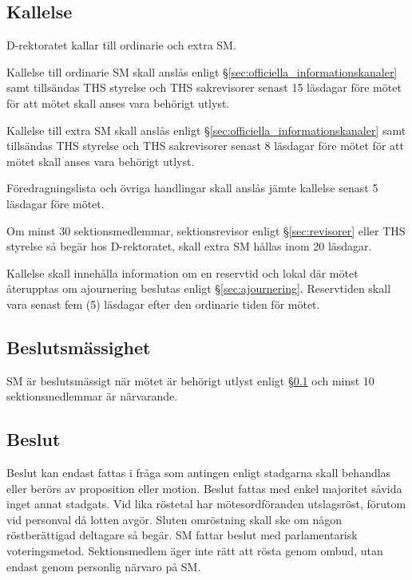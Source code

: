 \documentclass{dgovdoc}
\begin{document}
\subsection{Kallelse}
\label{sec:kallelse}

D-rektoratet kallar till ordinarie och extra SM.

Kallelse till ordinarie SM skall anslås enligt
\S\ref{sec:officiella_informationskanaler} samt tillsändas THS styrelse och THS
sakrevisorer senast 15 läsdagar före mötet för att mötet skall anses vara
behörigt utlyst.

Kallelse till extra SM skall anslås enligt
\S\ref{sec:officiella_informationskanaler} samt tillsändas THS styrelse och THS
sakrevisorer senast 8 läsdagar före mötet för att mötet skall anses vara
behörigt utlyst.

Föredragningslista och övriga handlingar skall anslås jämte kallelse senast
5 läsdagar före mötet.

Om minst 30 sektionsmedlemmar, sektionsrevisor enligt \S\ref{sec:revisorer} eller
THS styrelse så begär hos D-rektoratet, skall extra SM hållas inom 20 läsdagar.

Kallelse skall innehålla information om en reservtid och lokal där mötet
återupptas om ajournering beslutas enligt \S\ref{sec:ajournering}. Reservtiden
skall vara senast fem (5) läsdagar efter den ordinarie tiden för mötet.

\subsection{Beslutsmässighet}

SM är beslutsmässigt när mötet är behörigt utlyst enligt 
\S\ref{sec:kallelse} och minst 10 sektionsmedlemmar är närvarande.

\subsection{Beslut}

Beslut kan endast fattas i fråga som antingen enligt stadgarna skall behandlas
eller berörs av proposition eller motion. Beslut fattas med enkel majoritet
såvida inget annat stadgats. Vid lika röstetal har mötesordföranden
utslagsröst, förutom vid personval då lotten avgör. Sluten omröstning skall ske
om någon röstberättigad deltagare så begär. SM fattar beslut med parlamentarisk
voteringsmetod. Sektionsmedlem äger inte rätt att rösta genom ombud, utan
endast genom personlig närvaro på SM.
\end{document}
